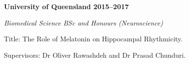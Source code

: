 \textbf{University of Queensland \hfill 2015--2017} \par
\textit{Biomedical Science BSc and Honours (Neuroscience)} \par
Title: The Role of Melatonin on Hippocampal Rhythmicity.\par
Supervisors: Dr Oliver Rawashdeh and Dr Prasad Chunduri.\par